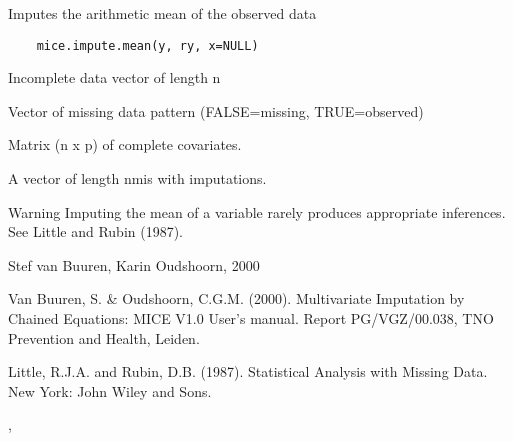 \begin{Description}\relax
Imputes the arithmetic mean of the observed data
\end{Description}
\begin{Usage}
\begin{verbatim}
    mice.impute.mean(y, ry, x=NULL)
\end{verbatim}
\end{Usage}
\begin{Arguments}
\begin{ldescription}
\item[\code{y}] Incomplete data vector of length n
\item[\code{ry}] Vector of missing data pattern (FALSE=missing, TRUE=observed)
\item[\code{x}] Matrix (n x p) of complete covariates.

\end{ldescription}


\value{
A vector of length nmis with imputations.}
\end{Arguments}
\begin{Value}
A vector of length nmis with imputations.
\end{Value}
\begin{Section}{Warning}
Imputing the mean of a variable rarely produces appropriate inferences.
See Little and Rubin (1987).
\end{Section}
\begin{Author}\relax
Stef van Buuren, Karin Oudshoorn, 2000
\end{Author}
\begin{References}\relax
Van Buuren, S. \& Oudshoorn, C.G.M. (2000). Multivariate Imputation by Chained Equations: 
MICE V1.0 User's manual. Report PG/VGZ/00.038, TNO Prevention and Health, Leiden.

Little, R.J.A. and Rubin, D.B. (1987). Statistical Analysis with Missing Data. 
New York: John Wiley and Sons.
\end{References}
\begin{SeeAlso}\relax
{}, 
\end{SeeAlso}

